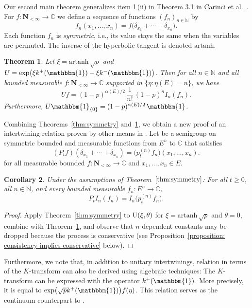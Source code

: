 \documentclass[10pt,a4paper]{amsart}
\numberwithin{equation}{section}
\newtheorem{Theorem}{Theorem}[section]
\newtheorem{Corollary}[Theorem]{Corollary}
\newcommand{\N}{\mathbb{N}}
\newcommand{\C}{\mathbb{C}}
\newcommand{\one}{\mathbbm{1}}
\newcommand{\1}{\mathbbm{1}}
\begin{document}
Our second main theorem generalizes item 1\,(ii) in Theorem 3.1 in Carinci et al.~\cite{carinci2019orthogonal}.
For $f\colon \mathbf N_{<\infty}\to \C$ we define a sequence of functions $(f_n)_{n\in \N}$ by
\[
	 f_n(x_1,\ldots, x_n) = f(\delta_{x_1}+\cdots + \delta_{x_n} \bigr).
\]
Each function $f_n$ is \emph{symmetric}, i.e., its value stays the same when the variables are permuted. The inverse of the hyperbolic tangent is denoted $\mathrm{artanh}$.


\begin{Theorem} \label{thm:unitary-meixner}
	Let $\xi= \mathrm{artanh}\, \sqrt p$ and $U= \exp\bigl(\xi k^+(\1) - \xi k^-(\1)\bigr)$. Then for all $n\in \N$ and all bounded measurable $f\colon \mathbf N_{<\infty}\to \C$ supported in
$\{\eta\colon \eta(E)=n\}$, we have
	\[
		 U f = (1-p)^{\alpha(E)/2} \, \frac{1}{n!}\, (1-p)^n I_n(f_n).
	\]
	Furthermore, $ U \1_{\{0\}} = (1-p)^{\alpha(E)/2} \, \1$.
\end{Theorem}


Combining Theorems~\ref{thm:symmetry} and~\ref{thm:unitary-meixner}, we obtain a new proof of an intertwining relation proven by other means in \cite[Theorems~3.15 and~5.2]{IntertwiningConsistent}. Let  be a semigroup on symmetric bounded and measurable functions from $E^n$ to $\C$ that satisfies
\[
	(P_t f)(\delta_{x_1}+\cdots + \delta_{x_n}) = \bigl(p_t^{(n)} f_n\bigr)(x_1,\ldots,x_n).
\]
for all measurable bounded $f \colon \mathbf{N}_{<\infty} \to \C$ and $x_1, \ldots, x_n \in E$.
\begin{Corollary} \label{cor:meixner-intertwining}
	Under the assumptions of Theorem~$\ref{thm:symmetry}$: For all $t\geq 0$, all $n\in \N$, and every bounded measurable $f_n\colon E^n\to \C$,
	\[
		P_t I_n(f_n) = I_n\bigl(p_t^{(n)} f_n\bigr).
	\]
\end{Corollary}

\begin{proof}
	Apply Theorem~\ref{thm:symmetry} to ${\rm U}(\xi,\theta)$ for $\xi =\mathrm{artanh}\, \sqrt p$ and $\theta =0$, combine with Theorem~\ref{thm:unitary-meixner}, and observe that $n$-dependent constants may be dropped because the process is conservative (see Proposition~\ref{proposition: consistency implies conservative} below).
\end{proof}

Furthermore, we note that, in addition to unitary intertwinings, relation \cite[equa\-tion~(3.6)]{IntertwiningConsistent} in terms of the $K$-transform can also be derived using algebraic techniques: The $K$-transform can be expressed with the operator $k^+(\one)$. More precisely, it is equal to $\exp \bigl(\sqrt{p} k^+(\one) \bigr) f(\eta)$. This relation serves as the continuum counterpart to \cite[Lemma~4.2]{carinci2021consistent}.
\end{document}
